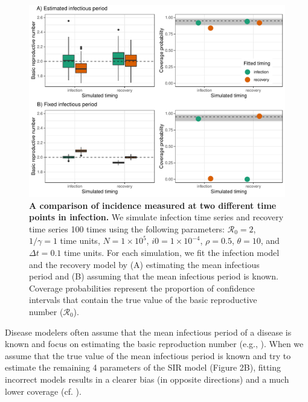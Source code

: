 \documentclass[12pt]{article}\usepackage[]{graphicx}\usepackage[]{color}
\begin{document}
\begin{figure}
\includegraphics[width=\textwidth]{../figure/compare_deterministic.pdf}
\caption{
\textbf{A comparison of incidence measured at two different time points in infection.}
We simulate infection time series and recovery time series 100 times using the 
following parameters:  
$\mathcal R_0 = 2$, $1/\gamma = 1$ time units, $N = 1 \times 10^5$, $i0 = 1 \times 10^{-4}$,
$\rho = 0.5$, $\theta = 10$, and $\Delta t = 0.1$ time units.
For each simulation, we fit the infection model and the recovery model by
(A) estimating the mean infectious period and (B) assuming
that the mean infectious period is known.
Coverage probabilities represent the proportion of confidence intervals
that contain the true value of the basic reproductive number ($\mathcal R_0$).
}
\end{figure}

Disease modelers often assume that the mean infectious period of a disease
is known and focus on estimating the basic reproduction number (e.g.,
\cite{hooker2010parameterizing, lin2016seasonality, pons2018serotype}). 
When we assume that the true value of the mean infectious period is known
and try to estimate the remaining 4 parameters of the SIR model (Figure 2B), fitting
incorrect models results in a clearer bias (in opposite directions)
and a much lower coverage (cf. \cite{elderd2006uncertainty}).
\end{document}
